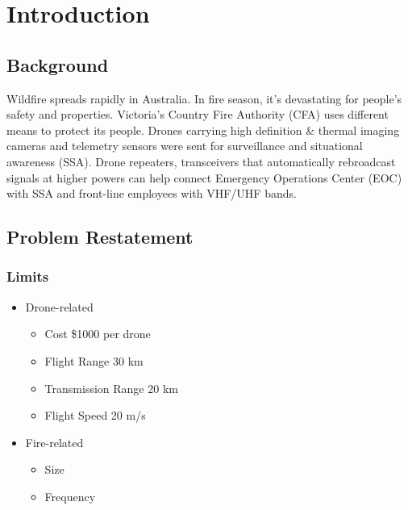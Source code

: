 \documentclass{mcmthesis}
\title{}
\date{\today}
\begin{document}






\tableofcontents
\newpage




\section{Introduction}

\graphicspath{{figures/}{../figures/}}

\subsection{Background}
Wildfire spreads rapidly in Australia. 
In fire season, it's devastating for people's safety and properties. Victoria's
Country Fire Authority (CFA) uses different means to protect its people. 
Drones carrying high definition \& thermal imaging cameras and telemetry 
sensors were sent for surveillance and situational awareness (SSA). 
Drone repeaters, transceivers that automatically rebroadcast signals 
at higher powers can help connect Emergency Operations Center (EOC) with SSA and front-line employees with VHF/UHF bands.

\subsection{Problem Restatement}

\subsubsection{Limits}

\begin{itemize}
  \item
    Drone-related
  
    \begin{itemize}
    \item
      Cost \$1000 per drone
    \item
      Flight Range 30 km
    \item
      Transmission Range 20 km
    \item
      Flight Speed 20 m/s
    \end{itemize}
  \item
    Fire-related
  
    \begin{itemize}
    \item
      Size
    \item
      Frequency
    \end{itemize}
  \end{itemize}
\end{document}
